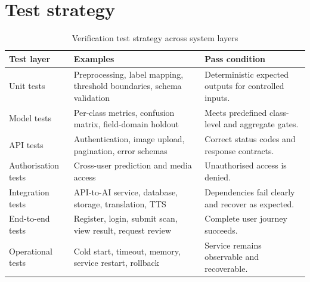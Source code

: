 \documentclass[12pt,a4paper,oneside,openany]{report}
\begin{document}
\section{Test strategy}
\begin{table}[H]
\centering
\small
\caption{Verification test strategy across system layers}\label{tab:test-strategy}
\begin{tabular}{P{3.0cm}P{5.0cm}P{5.0cm}}
\toprule
\textbf{Test layer} & \textbf{Examples} & \textbf{Pass condition}\\
\midrule
Unit tests & Preprocessing, label mapping, threshold boundaries, schema validation & Deterministic expected outputs for controlled inputs.\\
Model tests & Per-class metrics, confusion matrix, field-domain holdout & Meets predefined class-level and aggregate gates.\\
API tests & Authentication, image upload, pagination, error schemas & Correct status codes and response contracts.\\
Authorisation tests & Cross-user prediction and media access & Unauthorised access is denied.\\
Integration tests & API-to-AI service, database, storage, translation, TTS & Dependencies fail clearly and recover as expected.\\
End-to-end tests & Register, login, submit scan, view result, request review & Complete user journey succeeds.\\
Operational tests & Cold start, timeout, memory, service restart, rollback & Service remains observable and recoverable.\\
\bottomrule
\end{tabular}
\end{table}
\end{document}
